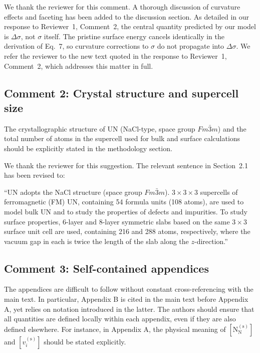 \documentclass[12pt]{article}
\begin{document}
We thank the reviewer for this comment. A thorough discussion of curvature effects and faceting has been added to the discussion section. As detailed in our response to Reviewer~1, Comment~2, the central quantity predicted by our model is $\Delta \sigma$, not $\sigma$ itself. The pristine surface energy cancels identically in the derivation of Eq.~7, so curvature corrections to $\sigma$ do not propagate into $\Delta \sigma$. We refer the reviewer to the new text quoted in the response to Reviewer~1, Comment~2, which addresses this matter in full.

\subsection*{Comment 2: Crystal structure and supercell size}

\color{blue}
The crystallographic structure of UN (NaCl-type, space group $Fm\bar{3}m$) and the total number of atoms in the supercell used for bulk and surface calculations should be explicitly stated in the methodology section.\\
\color{black}

We thank the reviewer for this suggestion. The relevant sentence in Section~2.1 has been revised to:

\color{red} ``UN adopts the NaCl structure (space group $Fm\bar{3}m$). $3 \times 3 \times 3$ supercells of ferromagnetic (FM) UN, containing 54 formula units (108 atoms), are used to model bulk UN and to study the properties of defects and impurities. To study surface properties, 6-layer and 8-layer symmetric slabs based on the same $3 \times 3$ surface unit cell are used, containing 216 and 288 atoms, respectively, where the vacuum gap in each is twice the length of the slab along the $z$-direction.''
\color{black}

\subsection*{Comment 3: Self-contained appendices}

\color{blue}
The appendices are difficult to follow without constant cross-referencing with the main text. In particular, Appendix B is cited in the main text before Appendix A, yet relies on notation introduced in the latter. The authors should ensure that all quantities are defined locally within each appendix, even if they are also defined elsewhere. For instance, in Appendix A, the physical meaning of $[\text{N}_\text{N}^{(\text{s})}]$ and $[v_i^{(\text{s})}]$ should be stated explicitly.
\\
\end{document}

